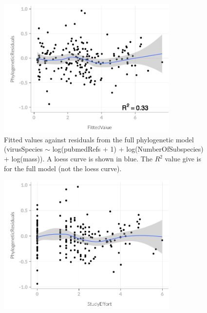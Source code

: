 \begin{knitrout}\footnotesize
{}\color{fgcolor}\begin{figure}[t]

{\centering \includegraphics[width=0.8\textwidth]{figure/subsAnalysis-1} 

}

\caption[Fitted values against residuals from the full phylogenetic model (virusSpecies ]{Fitted values against residuals from the full phylogenetic model (virusSpecies $\sim$ log(pubmedRefs + 1) + log(NumberOfSubspecies) +  log(mass)). A loess curve is shown in blue. 
The $R^2$ value give is for the full model (not the loess curve).}\label{fig:subsAnalysis}
\end{figure}

\begin{figure}[t]

{\centering \includegraphics[width=0.8\textwidth]{figure/subsAnalysis-2} 

}
\end{figure}
\end{knitrout}
